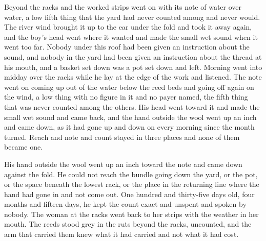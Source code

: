 \scenebreak

Beyond the racks and the worked strips  went on with its note of water over water, a low fifth thing that the yard had never counted among  and never would. The river wind brought it up to the ear under the fold and took it away again, and the boy's head went where it wanted and made the small wet sound when it went too far. Nobody under this roof had been given an instruction about the sound, and nobody in the yard had been given an instruction about the thread at his mouth, and a basket set down was a pot set down and left. Morning went into midday over the racks while he lay at the edge of the work and listened. The note went on coming up out of the water below the reed beds and going off again on the wind, a low thing with no figure in it and no payer named, the fifth thing that was never counted among the others. His head went toward it and made the small wet sound and came back, and the hand outside the wool went up an inch and came down, as it had gone up and down on every morning since the month turned. Reach and note and count stayed in three places and none of them became one.

His hand outside the wool went up an inch toward the note and came down against the fold. He could not reach the bundle going down the yard, or the pot, or the space beneath the lowest rack, or the place in the returning line where the hand had gone in and not come out. One hundred and thirty-five days old, four months and fifteen days, he kept the count exact and unspent and spoken by nobody. The woman at the racks went back to her strips with the weather in her mouth. The reeds stood grey in the ruts beyond the racks, uncounted, and the arm that carried them knew what it had carried and not what it had cost.
